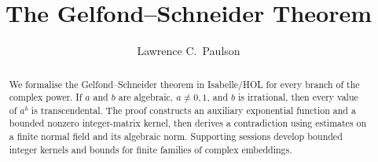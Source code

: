 \documentclass[11pt,a4paper]{article}
\begin{document}
\title{The Gelfond--Schneider Theorem}
\author{Lawrence C.\ Paulson}
\maketitle

\begin{abstract}
We formalise the Gelfond--Schneider theorem in Isabelle/HOL for every
branch of the complex power. If \(a\) and \(b\) are algebraic,
\(a\ne 0,1\), and \(b\) is irrational, then every value of \(a^b\)
is transcendental. The proof constructs an auxiliary exponential
function and a bounded nonzero integer-matrix kernel, then derives a
contradiction using estimates on a finite normal field and its
algebraic norm. Supporting sessions develop bounded integer kernels
and bounds for finite families of complex embeddings.
\end{abstract}


\end{document}
